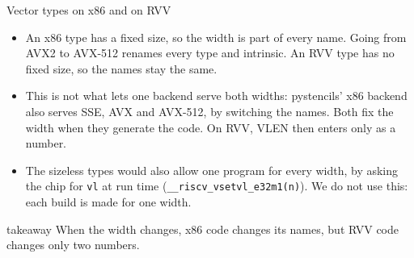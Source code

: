 \documentclass[aspectratio=169,10pt,t]{beamer}
\newcommand{\code}[1]{\texttt{#1}}
\newcommand{\takeaway}[1]{\par\vfill
  \begin{beamercolorbox}[wd=\textwidth,sep=4pt,rounded=true]{takeaway}
    \small #1
  \end{beamercolorbox}}
\begin{document}
\begin{frame}{Vector types on x86 and on RVV}
  \vspace{1mm}
  \centering\resizebox{\textwidth}{!}{}

  \vspace{2mm}
  \raggedright
  \begin{itemize}\footnotesize
    \item An x86 type has a fixed size, so the width is part of every name. Going from AVX2 to AVX-512 renames
          every type and intrinsic. An RVV type has no fixed size, so the names stay the same.
    \item This is not what lets one backend serve both widths: pystencils' x86 backend also serves SSE, AVX and
          AVX-512, by switching the names. Both fix the width when they generate the code. On RVV, VLEN then
          enters only as a number.
    \item The sizeless types would also allow one program for every width, by asking the chip for \code{vl} at
          run time (\code{\_\_riscv\_vsetvl\_e32m1(n)}). We do not use this: each build is made for one width.
  \end{itemize}
  \takeaway{When the width changes, x86 code changes its names, but RVV code changes only two numbers.}
\end{frame}

\end{document}
